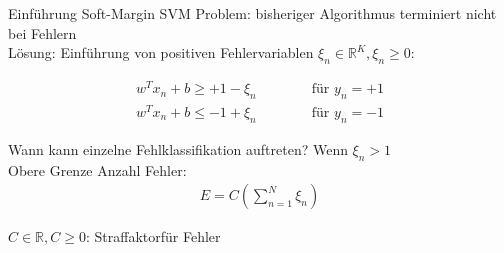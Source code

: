\documentclass[ngerman]{beamer}
\begin{document}
\begin{frame}{Einführung Soft-Margin SVM}
	Problem: bisheriger Algorithmus terminiert nicht bei Fehlern \\
	Lösung: Einführung von positiven Fehlervariablen $\xi_{n} \in \mathbb{R}^{K}, \xi_{n} \geq 0$:
	
	\begin{subequations}
		\begin{alignat*}{2}
			w^{T} x_{n} + b \geq +1 - \xi_{n}& \qquad & \text{ für } y_{n} = +1\\
			w^{T} x_{n} + b \leq -1 + \xi_{n}& & \text{ für } y_{n} = -1
		\end{alignat*}
	\end{subequations}

	Wann kann einzelne Fehlklassifikation auftreten? Wenn $\xi_{n} > 1$ \\
	
	Obere Grenze Anzahl Fehler:
	\begin{equation*}
		\begin{aligned}
			E = C(\sum_{n=1}^{N} \xi_{n})
		\end{aligned}
	\end{equation*}

	$C \in \mathbb{R}, C \geq 0$: \glqq Straffaktor\grqq für Fehler
\end{frame}
\end{document}
